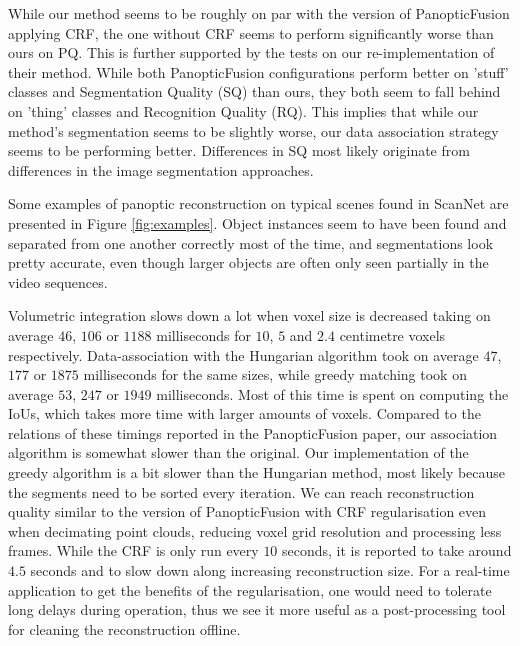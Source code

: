 While our method seems to be roughly on par with the version of PanopticFusion applying CRF, the one without CRF seems to perform significantly worse than ours on PQ. This is further supported by the tests on our re-implementation of their method. While both PanopticFusion configurations perform better on 'stuff' classes and Segmentation Quality (SQ) than ours, they both seem to fall behind on 'thing' classes and Recognition Quality (RQ). This implies that while our method's segmentation seems to be slightly worse, our data association strategy seems to be performing better. Differences in SQ most likely originate from differences in the image segmentation approaches.

Some examples of panoptic reconstruction on typical scenes found in ScanNet are presented in Figure \ref{fig:examples}. Object instances seem to have been found and separated from one another correctly most of the time, and segmentations look pretty accurate, even though larger objects are often only seen partially in the video sequences.

Volumetric integration slows down a lot when voxel size is decreased taking on average $46$, $106$ or $1188$ milliseconds for $10$, $5$ and $2.4$ centimetre voxels respectively. Data-association with the Hungarian algorithm took on average $47$, $177$ or $1875$ milliseconds for the same sizes, while greedy matching took on average $53$, $247$ or $1949$ milliseconds. Most of this time is spent on computing the IoUs, which takes more time with larger amounts of voxels. Compared to the relations of these timings reported in the PanopticFusion paper, our association algorithm is somewhat slower than the original. Our implementation of the greedy algorithm is a bit slower than the Hungarian method, most likely because the segments need to be sorted every iteration. We can reach reconstruction quality similar to the version of PanopticFusion with CRF regularisation even when decimating point clouds, reducing voxel grid resolution and processing less frames. While the CRF is only run every $10$ seconds, it is reported to take around $4.5$ seconds and to slow down along increasing reconstruction size. For a real-time application to get the benefits of the regularisation, one would need to tolerate long delays during operation, thus we see it more useful as a post-processing tool for cleaning the reconstruction offline. 
